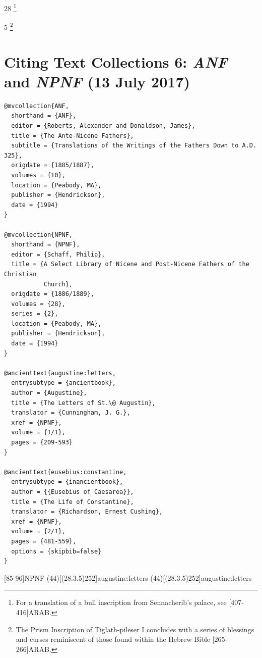 \documentclass[a4paper]{article}
\begin{document}
\begin{fverbcite}{28}
  \footnote{For a translation of a bull inscription from Sennacherib’s palace,
    see [407-416]{ARAB}.}
\end{fverbcite}
\begin{fverbcite}{5}
  \footnote{The Prism Inscription of Tiglath-pileser I concludes with a series
    of blessings and curses reminiscent of those found within the Hebrew Bible
    [265-266]{ARAB}.}
\end{fverbcite}
\exampleabbreviations
{}

\section{Citing Text Collections 6: \emph{ANF} and \emph{NPNF} (13 July 2017)}

\begin{verbatim}
@mvcollection{ANF,
  shorthand = {ANF},
  editor = {Roberts, Alexander and Donaldson, James},
  title = {The Ante-Nicene Fathers},
  subtitle = {Translations of the Writings of the Fathers Down to A.D. 325},
  origdate = {1885/1887},
  volumes = {10},
  location = {Peabody, MA},
  publisher = {Hendrickson},
  date = {1994}
}

@mvcollection{NPNF,
  shorthand = {NPNF},
  editor = {Schaff, Philip},
  title = {A Select Library of Nicene and Post-Nicene Fathers of the Christian
           Church},
  origdate = {1886/1889},
  volumes = {28},
  series = {2},
  location = {Peabody, MA},
  publisher = {Hendrickson},
  date = {1994}
}

@ancienttext{augustine:letters,
  entrysubtype = {ancientbook},
  author = {Augustine},
  title = {The Letters of St.\@ Augustin},
  translator = {Cunningham, J. G.},
  xref = {NPNF},
  volume = {1/1},
  pages = {209-593}
}

@ancienttext{eusebius:constantine,
  entrysubtype = {inancientbook},
  author = {{Eusebius of Caesarea}},
  title = {The Life of Constantine},
  translator = {Richardson, Ernest Cushing},
  xref = {NPNF},
  volume = {2/1},
  pages = {481-559},
  options = {skipbib=false}
}
\end{verbatim}

[85-96]{NPNF}
\examplecite(44)[(28.3.5)252]{augustine:letters}
\examplecite[atrans](44)[(28.3.5)252]{augustine:letters}
\begin{verbcite}
  \nocite{ANF, eusebius:constantine}
\end{verbcite}
\exampleabbreviations
\examplebibliography
{}
\end{document}
